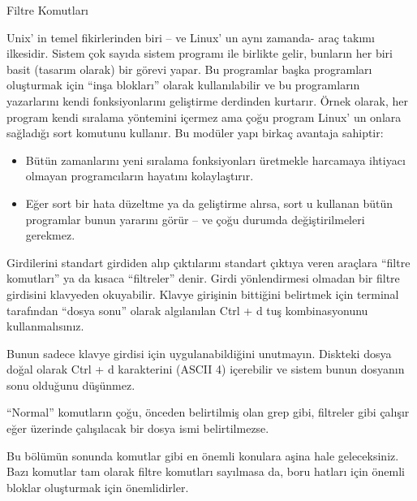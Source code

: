 \begin{section}{Filtre Komutları}

Unix' in temel fikirlerinden biri – ve Linux' un aynı zamanda- araç takımı ilkesidir. Sistem çok sayıda sistem programı ile birlikte gelir, bunların her biri basit (tasarım olarak) bir görevi yapar. Bu programlar başka programları oluşturmak için “inşa blokları” olarak kullanılabilir ve bu programların yazarlarını kendi fonksiyonlarını geliştirme derdinden kurtarır. Örnek olarak, her program kendi sıralama yöntemini içermez ama çoğu program Linux' un onlara sağladığı sort komutunu kullanır. Bu modüler yapı birkaç avantaja sahiptir:

\begin{itemize}
\item Bütün zamanlarını yeni sıralama fonksiyonları üretmekle harcamaya ihtiyacı olmayan programcıların hayatını kolaylaştırır.
\item Eğer sort bir hata düzeltme ya da geliştirme alırsa, sort u kullanan bütün programlar bunun yararını görür –  ve çoğu durumda değiştirilmeleri gerekmez.
\end{itemize}

Girdilerini standart girdiden alıp çıktılarını standart çıktıya veren araçlara “filtre komutları” ya da kısaca “filtreler” denir. Girdi yönlendirmesi olmadan bir filtre girdisini klavyeden okuyabilir. Klavye girişinin bittiğini belirtmek için terminal tarafından “dosya sonu” olarak algılanılan Ctrl + d tuş kombinasyonunu kullanmalısınız.

Bunun sadece klavye girdisi için uygulanabildiğini unutmayın. Diskteki dosya doğal olarak Ctrl + d karakterini (ASCII 4) içerebilir ve sistem bunun dosyanın sonu olduğunu düşünmez.

“Normal” komutların çoğu, önceden belirtilmiş olan grep gibi, filtreler gibi çalışır eğer üzerinde çalışılacak bir dosya ismi belirtilmezse.

Bu bölümün sonunda komutlar gibi en önemli konulara aşina hale geleceksiniz. Bazı komutlar tam olarak filtre komutları sayılmasa da, boru hatları için önemli bloklar oluşturmak için önemlidirler.


\end{section}
